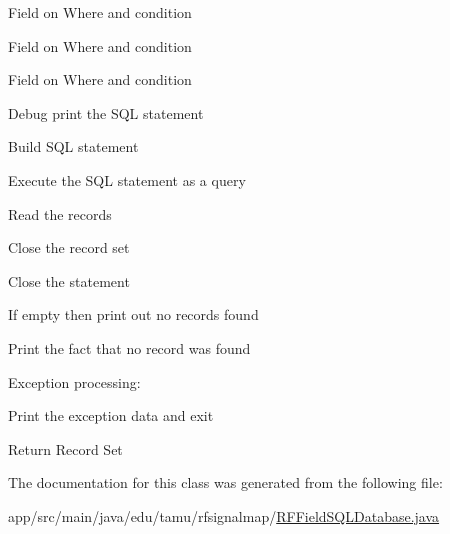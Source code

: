 Field on Where and condition

Field on Where and condition

Field on Where and condition

Debug print the S\+QL statement

Build S\+QL statement

Execute the S\+QL statement as a query

Read the records

Close the record set

Close the statement

If empty then print out no records found

Print the fact that no record was found

Exception processing\+:

Print the exception data and exit

Return Record Set 

The documentation for this class was generated from the following file\+:\begin{DoxyCompactItemize}
\item 
app/src/main/java/edu/tamu/rfsignalmap/\hyperlink{_r_f_field_s_q_l_database_8java}{R\+F\+Field\+S\+Q\+L\+Database.\+java}\end{DoxyCompactItemize}
